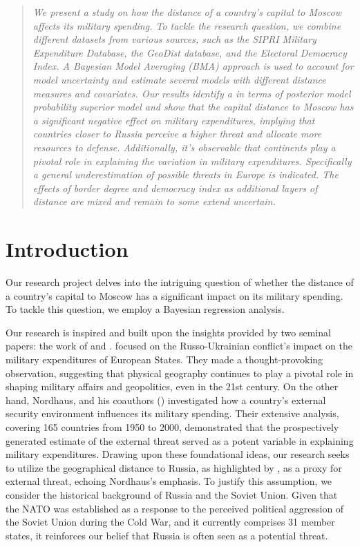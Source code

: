 \documentclass[12pt,a4paper]{article}
\begin{document}
\begin{abstract}
\textit{We present a study on how the distance of a country’s capital to Moscow affects its military spending. To tackle the research question, we combine different datasets from various sources, such as the SIPRI Military Expenditure Database, the GeoDist database, and the Electoral Democracy Index. A Bayesian Model Averaging (BMA) approach is used to account for model uncertainty and estimate several models with different distance measures and covariates. Our results identify a in terms of posterior model probability superior model and show that the capital distance to Moscow has a significant negative effect on military expenditures, implying that countries closer to Russia perceive a higher threat and allocate more resources to defense. Additionally, it's observable that continents play a pivotal role in explaining the variation in military expenditures. Specifically a general underestimation of possible threats in Europe is indicated. The effects of border degree and democracy index as additional layers of distance are mixed and remain to some extend uncertain.} 
\end{abstract}
\clearpage
\thispagestyle{plain}
\tableofcontents
\pagebreak
{}
\section{Introduction}
Our research project delves into the intriguing question of whether the distance of a country's capital to Moscow has a significant impact on its military spending. To tackle this question, we employ a Bayesian regression analysis.

Our research is inspired and built upon the insights provided by two seminal papers: the work of \citet{kofrovn2023} and \citet{nordhaus2012}. \citet{kofrovn2023} focused on the Russo-Ukrainian conflict's impact on the military expenditures of European States. They made a thought-provoking observation, suggesting that physical geography continues to play a pivotal role in shaping military affairs and geopolitics, even in the 21st century. On the other hand, Nordhaus, and his coauthors (\citeyear{nordhaus2012}) investigated how a country's external security environment influences its military spending. Their extensive analysis, covering 165 countries from 1950 to 2000, demonstrated that the prospectively generated estimate of the external threat served as a potent variable in explaining military expenditures. Drawing upon these foundational ideas, our research seeks to utilize the geographical distance to Russia, as highlighted by \citet{kofrovn2023}, as a proxy for external threat, echoing Nordhaus's emphasis. To justify this assumption, we consider the historical background of Russia and the Soviet Union. Given that the NATO was established as a response to the perceived political aggression of the Soviet Union during the Cold War, and it currently comprises 31 member states, it reinforces our belief that Russia is often seen as a potential threat.
\end{document}
